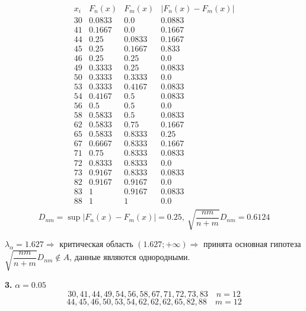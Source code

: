 \documentclass[9pt]{article}
\begin{document}
\[\begin{array}{c|c|c|c|c|c}
    x_i & F_n(x) & F_m(x) & |F_n(x)-F_m(x)| \\
    \hline
    30 & 0.0833 & 0.0 & 0.0883 \\
    41 & 0.1667 & 0.0 & 0.1667\\
    44 & 0.25 & 0.0833 & 0.1667\\
    45 & 0.25 & 0.1667 & 0.833\\
    46 & 0.25 & 0.25 & 0.0\\
    49 & 0.3333 & 0.25 & 0.0833\\
    50 & 0.3333 & 0.3333 & 0.0\\
    53 & 0.3333 & 0.4167 & 0.0833\\
    54 & 0.4167 & 0.5 & 0.0833\\
    56 & 0.5 & 0.5 & 0.0\\
    58 & 0.5833 & 0.5 & 0.0833\\
    62 & 0.5833 & 0.75 & 0.1667\\
    65 & 0.5833 & 0.8333 & 0.25\\
    67 & 0.6667 & 0.8333 & 0.1667\\
    71 & 0.75 & 0.8333 & 0.0833\\
    72 & 0.8333 & 0.8333 & 0.0\\
    73 & 0.9167 & 0.8333 & 0.0833\\
    82 & 0.9167 & 0.9167 & 0.0\\
    83 & 1 & 0.9167 & 0.0833\\
    88 & 1 & 1 & 0.0\\
\end{array}\]
\[D_{nm}=\sup|F_n(x)-F_m(x)|=0.25,\ \sqrt{\dfrac{nm}{n+m}}D_{nm}=0.6124\]
\par\(\lambda_\alpha=1.627\Rightarrow\) критическая область \((1.627;+\infty)\Rightarrow\) принята основная гипотеза \(\sqrt{\dfrac{nm}{n+m}}D_{nm}\nin A\), данные являются однородными.
\par\textbf{3.} \(\alpha=0.05\)
\[30,41,44,49,54,56,58,67,71,72,73,83\quad n=12\]
\[44,45,46,50,53,54,62,62,62,65,82,88\quad m=12\]
\end{document}
